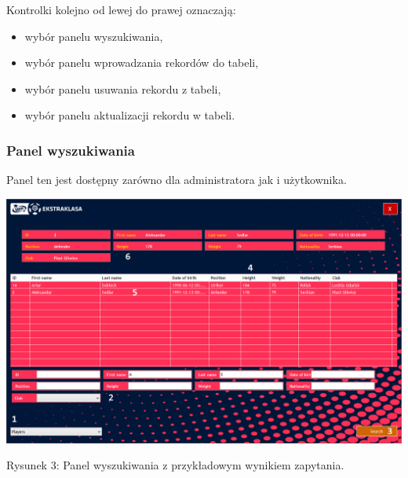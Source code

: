 \documentclass[12pt,a4paper]{article}
\begin{document}
    Kontrolki kolejno od lewej do prawej oznaczają:
    \begin{itemize}
        \item wybór panelu wyszukiwania,
        \item wybór panelu wprowadzania rekordów do tabeli,
        \item wybór panelu usuwania rekordu z tabeli,
        \item wybór panelu aktualizacji rekordu w tabeli.
    \end{itemize}
    
    \subsubsection{Panel wyszukiwania}
    Panel ten jest dostępny zarówno dla administratora jak i użytkownika.
    \begin{center}
        \includegraphics[scale=0.47]{select-panel.png}
        \begin{flushleft}
            \begin{scriptsize}
            \begin{list}{}{\leftmargin=13.5em}\raggedright\item\relax
            Rysunek 3: Panel wyszukiwania z przykładowym wynikiem zapytania.
            \end{list}
            \end{scriptsize}
        \end{flushleft}
    \end{center}
    
\end{document}
